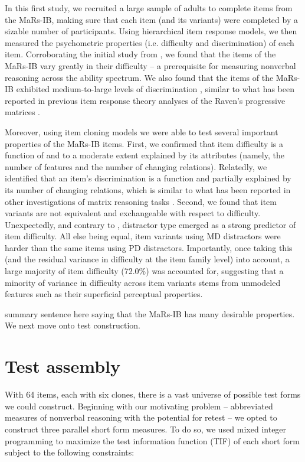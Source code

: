 \documentclass[a4paper,man,natbib]{apa6}
\begin{document}
In this first study, we recruited a large sample of adults to complete items from the MaRs-IB, making sure that each item (and its variants) were completed by a sizable number of participants. Using hierarchical item response models, we then measured the psychometric properties (i.e. difficulty and discrimination) of each item. Corroborating the initial study from \cite{chierchia2019matrix}, we found that the items of the MaRs-IB vary greatly in their difficulty -- a prerequisite for measuring nonverbal reasoning across the ability spectrum. We also found that the items of the MaRs-IB exhibited medium-to-large levels of discrimination \citep{baker2017basics}, similar to what has been reported in previous item response theory analyses of the Raven's progressive matrices \citep{chiesi2012using}.

Moreover, using item cloning models we were able to test several important properties of the MaRs-IB items. First, we confirmed that item difficulty is a function of and to a moderate extent explained by its attributes (namely, the number of features and the number of changing relations). Relatedly, we identified that an item's discrimination is a function and partially explained by its number of changing relations, which is similar to what has been reported in other investigations of matrix reasoning tasks \citep{embretson1999generating}. Second, we found that item variants are not equivalent and exchangeable with respect to difficulty. Unexpectedly, and contrary to \cite{chierchia2019matrix}, distractor type emerged as a strong predictor of item difficulty. All else being equal, item variants using MD distractors were harder than the same items using PD distractors. Importantly, once taking this (and the residual variance in difficulty at the item family level) into account, a large majority of item difficulty (72.0\%) was accounted for, suggesting that a minority of variance in difficulty across item variants stems from unmodeled features such as their superficial perceptual properties. 

summary sentence here saying that the MaRs-IB has many desirable properties. We next move onto test construction.

\section{Test assembly}

With 64 items, each with six clones, there is a vast universe of possible test forms we could construct. Beginning with our motivating problem -- abbreviated measures of nonverbal reasoning with the potential for retest -- we opted to construct three parallel short form measures. To do so, we used mixed integer programming \citep{der2005wj} to maximize the test information function (TIF) of each short form subject to the following constraints:
\end{document}
